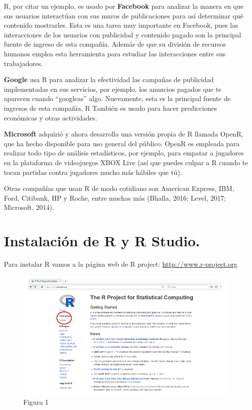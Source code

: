 \documentclass[
]{book}
\begin{document}
R, por citar un ejemplo, es usado por \textbf{Facebook} para analizar la manera en que sus usuarios interactúan con sus muros de publicaciones para así determinar qué contenido mostrarles. Esta es una tarea muy importante en Facebook, pues las interacciones de los usuarios con publicidad y contenido pagado son la principal fuente de ingreso de esta compañía. Además de que su división de recursos humanos emplea esta herramienta para estudiar las interacciones entre sus trabajadores.

\textbf{Google} usa R para analizar la efectividad las campañas de publicidad implementadas en sus servicios, por ejemplo, los anuncios pagados que te aparecen cuando ``googleas'' algo. Nuevamente, esta es la principal fuente de ingresos de esta compañía. R También es usado para hacer predicciones económicas y otras actividades.

\textbf{Microsoft} adquirió y ahora desarrolla una versión propia de R llamada OpenR, que ha hecho disponible para uso general del público. OpenR es empleada para realizar todo tipo de análisis estadísticos, por ejemplo, para empatar a jugadores en la plataforma de videojuegos XBOX Live (así que puedes culpar a R cuando te tocan partidas contra jugadores mucho más hábiles que tú).

Otras compañías que usan R de modo cotidiano son American Express, IBM, Ford, Citibank, HP y Roche, entre muchas más (Bhalla, 2016; Level, 2017; Microsoft, 2014).

\hypertarget{instalaciuxf3n-de-r-y-r-studio.}{%
\section{Instalación de R y R Studio.}\label{instalaciuxf3n-de-r-y-r-studio.}}

Para instalar R vamos a la página web de R project: \url{http://www.r-project.org}

\begin{figure}
\centering
\includegraphics{imagenes/01.png}
\caption{Figura 1}
\end{figure}
\end{document}
